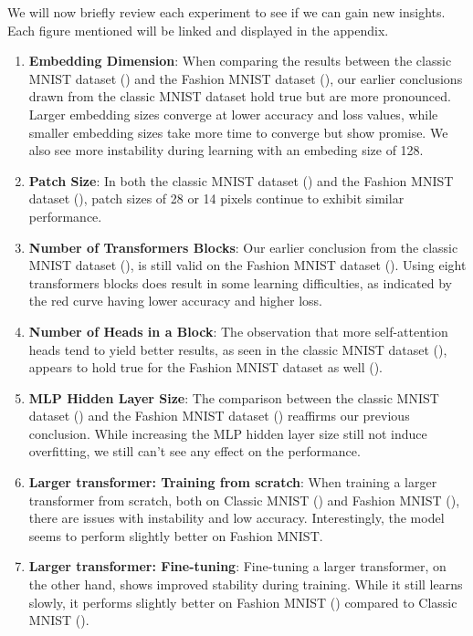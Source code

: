 We will now briefly review each experiment to see if we can gain new insights. Each figure mentioned will be linked and displayed in the appendix.
\begin{enumerate}
    \item \textbf{Embedding Dimension}: When comparing the results between the classic MNIST dataset () and the Fashion MNIST dataset (), our earlier conclusions drawn from the classic MNIST dataset hold true but are more pronounced. Larger embedding sizes converge at lower accuracy and loss values, while smaller embedding sizes take more time to converge but show promise. We also see more instability during learning with an embeding size of 128.

    \item \textbf{Patch Size}: In both the classic MNIST dataset () and the Fashion MNIST dataset (), patch sizes of 28 or 14 pixels continue to exhibit similar performance. 

    \item \textbf{Number of Transformers Blocks}: Our earlier conclusion from the classic MNIST dataset (), is still valid on the Fashion MNIST dataset (). Using eight transformers blocks does result in some learning difficulties, as indicated by the red curve having lower accuracy and higher loss.

    \item \textbf{Number of Heads in a Block}: The observation that more self-attention heads tend to yield better results, as seen in the classic MNIST dataset (), appears to hold true for the Fashion MNIST dataset as well ().

    \item \textbf{MLP Hidden Layer Size}: The comparison between the classic MNIST dataset () and the Fashion MNIST dataset () reaffirms our previous conclusion. While increasing the MLP hidden layer size still not induce overfitting, we still can't see any effect on the performance.
    
    \item \textbf{Larger transformer: Training from scratch}:  When training a larger transformer from scratch, both on Classic MNIST () and Fashion MNIST (), there are issues with instability and low accuracy. Interestingly, the model seems to perform slightly better on Fashion MNIST.
    
    \item \textbf{Larger transformer: Fine-tuning}: Fine-tuning a larger transformer, on the other hand, shows improved stability during training. While it still learns slowly, it performs slightly better on Fashion MNIST () compared to Classic MNIST ().
\end{enumerate}

